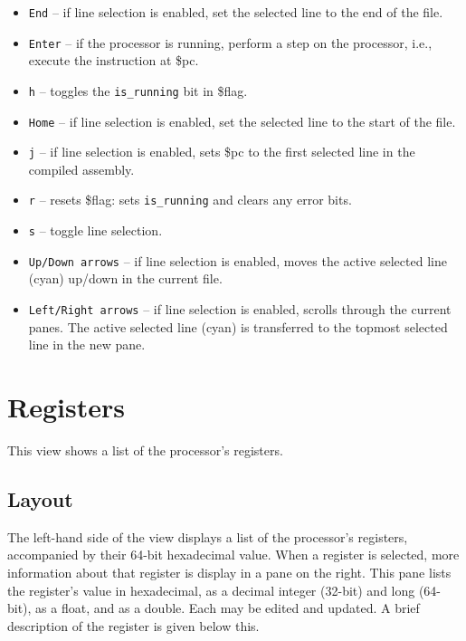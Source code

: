 \documentclass[10pt]{article}
\begin{document}
    \begin{itemize}
        \item \texttt{End} -- if line selection is enabled, set the selected line to the end of the file.
        \item \texttt{Enter} -- if the processor is running, perform a step on the processor, i.e., execute the instruction at \$pc.
        \item \texttt{h} -- toggles the \texttt{is\_running} bit in \$flag.
        \item \texttt{Home} -- if line selection is enabled, set the selected line to the start of the file.
        \item \texttt{j} -- if line selection is enabled, sets \$pc to the first selected line in the compiled assembly.
        \item \texttt{r} -- resets \$flag: sets \texttt{is\_running} and clears any error bits.
        \item \texttt{s} -- toggle line selection.
        \item \texttt{Up/Down arrows} -- if line selection is enabled, moves the active selected line (cyan) up/down in the current file.
        \item \texttt{Left/Right arrows} -- if line selection is enabled, scrolls through the current panes.
        The active selected line (cyan) is transferred to the topmost selected line in the new pane.
    \end{itemize}

    \section{Registers}

    This view shows a list of the processor's registers.

    \subsection{Layout}

    The left-hand side of the view displays a list of the processor's registers, accompanied by their 64-bit hexadecimal value.
    When a register is selected, more information about that register is display in a pane on the right.
    This pane lists the register's value in hexadecimal, as a decimal integer (32-bit) and long (64-bit), as a float, and as a double.
    Each may be edited and updated.
    A brief description of the register is given below this.
\end{document}
